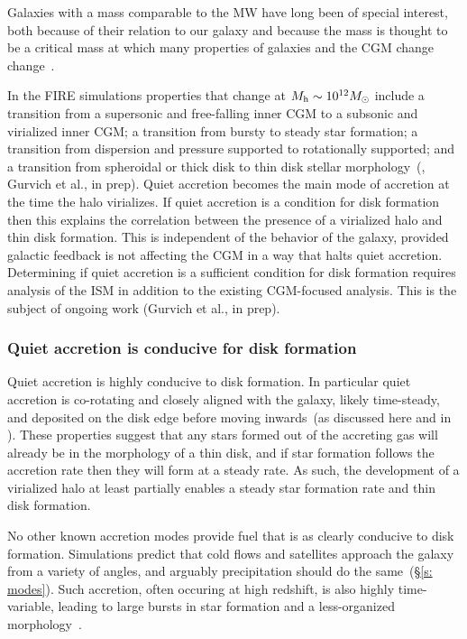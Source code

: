 \documentclass[fleqn,usenatbib]{mnras}
\begin{document}
Galaxies with a mass comparable to the MW have long been of special interest, both because of their relation to our galaxy and because the mass is thought to be a critical mass at which many properties of galaxies and the CGM change change~\citep[e.g.][]{Fielding2017, Correa2017, Dekel2019a}.

In the FIRE simulations properties that change at $M_{\rm h}\sim10^{12} M_\odot$ include a transition from a supersonic and free-falling inner CGM to a subsonic and virialized inner CGM;
a transition from bursty to steady star formation;
a transition from dispersion and pressure supported to rotationally supported;
and a transition from spheroidal or thick disk to thin disk stellar morphology~(\citealt{El-Badry2018a, Stern2020, Yu2021}, Gurvich et al., in prep).
Quiet accretion becomes the main mode of accretion at the time the halo virializes.
If quiet accretion is a condition for disk formation then this explains the correlation between the presence of a virialized halo and thin disk formation.
This is independent of the behavior of the galaxy, provided galactic feedback is not affecting the CGM in a way that halts quiet accretion.
Determining if quiet accretion is a sufficient condition for disk formation requires analysis of the ISM in addition to the existing CGM-focused analysis.
This is the subject of ongoing work (Gurvich et al., in prep).

\subsubsection{Quiet accretion is conducive for disk formation}
\label{s: disk formation -- conducive}

Quiet accretion is highly conducive to disk formation.
In particular quiet accretion is co-rotating and closely aligned with the galaxy, likely time-steady, and deposited on the disk edge before moving inwards~(as discussed here and in \citealt{Trapp2021}).
These properties suggest that any stars formed out of the accreting gas will already be in the morphology of a thin disk, and if star formation follows the accretion rate then they will form at a steady rate.
As such, the development of a virialized halo at least partially enables a steady star formation rate and thin disk formation.

No other known accretion modes provide fuel that is as clearly conducive to disk formation.
Simulations predict that cold flows and satellites approach the galaxy from a variety of angles, and arguably precipitation should do the same~(\S\ref{s: modes}).
Such accretion, often occuring at high redshift, is also highly time-variable, leading to large bursts in star formation and a less-organized morphology~\citep{Muratov2015, Muratov2017}.
\end{document}
